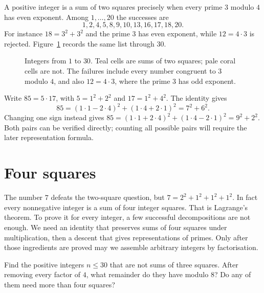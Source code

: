 \begin{examplex}
A positive integer is a sum of two squares precisely when every prime $3$ modulo $4$ has even exponent. Among $1,\ldots,20$ the successes are
\[
1,2,4,5,8,9,10,13,16,17,18,20.
\]
For instance $18=3^2+3^2$ and the prime $3$ has even exponent, while $12=4\cdot 3$ is rejected. Figure~\ref{fig:t1-representable} records the same list through $30$.
\end{examplex}

\begin{figure}[ht]
\centering
{}
\caption{Integers from $1$ to $30$. Teal cells are sums of two squares; pale coral cells are not. The failures include every number congruent to $3$ modulo $4$, and also $12=4\cdot 3$, where the prime $3$ has odd exponent.}
\label{fig:t1-representable}
\end{figure}

\begin{examplex}
Write $85=5\cdot17$, with $5=1^2+2^2$ and $17=1^2+4^2$.
The identity gives
\[
85=(1\cdot1-2\cdot4)^2+(1\cdot4+2\cdot1)^2=7^2+6^2.
\]
Changing one sign instead gives
$85=(1\cdot1+2\cdot4)^2+(1\cdot4-2\cdot1)^2=9^2+2^2$.
Both pairs can be verified directly; counting all possible pairs will require the later representation formula.
\end{examplex}

\section{Four squares}

The number $7$ defeats the two-square question, but $7=2^2+1^2+1^2+1^2$. In fact every nonnegative integer is a sum of four integer squares. That is Lagrange's theorem. To prove it for every integer, a few successful decompositions are not enough. We need an identity that preserves sums of four squares under multiplication, then a descent that gives representations of primes. Only after those ingredients are proved may we assemble arbitrary integers by factorisation.

\begin{think}
Find the positive integers $n\le30$ that are not sums of three squares. After removing every factor of $4$, what remainder do they have modulo $8$? Do any of them need more than four squares?
\end{think}

